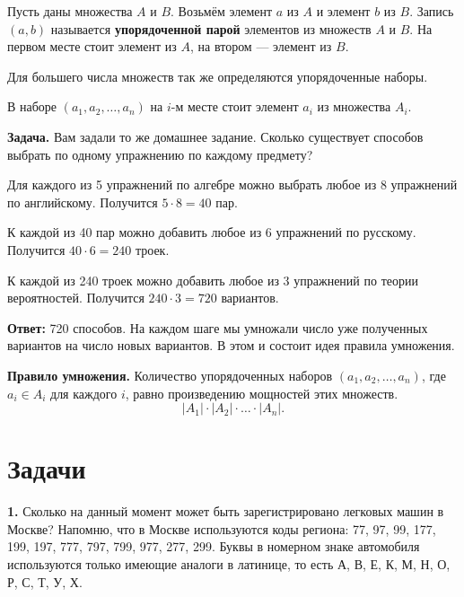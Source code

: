 \begin{definition}
    Пусть даны множества \(A\) и \(B\). Возьмём элемент \(a\) из \(A\) и элемент \(b\) из \(B\). Запись \((a,b)\) называется \textbf{упорядоченной парой} элементов из множеств \(A\) и \(B\). На первом месте стоит элемент из \(A\), на втором — элемент из \(B\).
\end{definition}

Для большего числа множеств так же определяются упорядоченные наборы.

В наборе \((a_1,a_2,\dots,a_n)\) на \(i\)-м месте стоит элемент \(a_i\) из множества \(A_i\).

\begin{example}\label{example-theory-2}
\textbf{Задача.} Вам задали то же домашнее задание. Сколько существует способов выбрать по одному упражнению по каждому предмету?
\end{example}

\begin{solution}\label{solution-combinatorics-rules-theory-2}
Для каждого из 5 упражнений по алгебре можно выбрать любое из 8 упражнений по английскому. Получится $5\cdot8=40$ пар.

К каждой из 40 пар можно добавить любое из 6 упражнений по русскому. Получится $40\cdot6=240$ троек.

К каждой из 240 троек можно добавить любое из 3 упражнений по теории вероятностей. Получится $240\cdot3=720$ вариантов.

\textbf{Ответ:} 720 способов. На каждом шаге мы умножали число уже полученных вариантов на число новых вариантов. В этом и состоит идея правила умножения.
\end{solution}

\begin{definition}
    \textbf{Правило умножения.} Количество упорядоченных наборов \((a_1,a_2,\dots,a_n)\), где \(a_i\in A_i\) для каждого \(i\), равно произведению мощностей этих множеств.
    \[
        \lvert A_1\rvert\cdot\lvert A_2\rvert\cdot\dots\cdot\lvert A_n\rvert.
    \]
\end{definition}

\section{Задачи}

\begin{task}\label{task-problems-1}
\textbf{1.} Сколько на данный момент может быть зарегистрировано легковых машин в Москве? Напомню, что в Москве используются коды региона: 77, 97, 99, 177, 199, 197, 777, 797, 799, 977, 277, 299. Буквы в номерном знаке автомобиля используются только имеющие аналоги в латинице, то есть А, В, Е, К, М, Н, О, Р, С, Т, У, Х.
\end{task}

